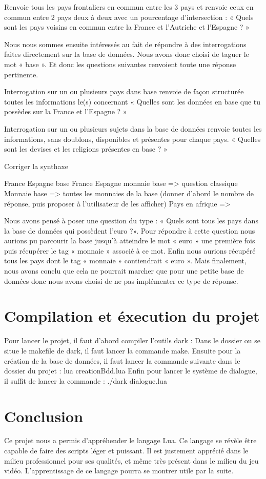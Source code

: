 \documentclass[11pt,a4paper]{article}
\begin{document}
Renvoie tous les pays frontaliers en commun entre les 3 pays et renvoie ceux en commun entre 2 pays deux à deux avec un pourcentage d’intersection :
« Quels sont les pays voisins en commun entre la France et l’Autriche et l’Espagne ? »
 
 
Nous nous sommes ensuite intéressés au fait de répondre à des interrogations faites directement sur la base de données. Nous avons donc choisi de taguer le mot « base ». Et donc les questions suivantes renvoient toute une réponse pertinente.
 
Interrogation sur un ou plusieurs pays dans base renvoie de façon structurée toutes les informations le(s) concernant
« Quelles sont les données en base que tu possèdes sur la France et l’Espagne ? »
 
Interrogation sur un ou plusieurs sujets dans la base de données renvoie toutes les informations, sans doublons, disponibles et présentes pour chaque pays.
« Quelles sont les devises et les religions présentes en base ? »
 
 
 
 
Corriger la synthaxe
 
France Espagne base
France Espagne monnaie base => question classique
Monnaie base => toutes les monnaies de la base  (donner d’abord le nombre de réponse, puis proposer à l’utilisateur de les afficher)
Pays en afrique =>
 
Nous avons pensé à poser une question du type : «  Quels sont tous les pays dans la base de données qui possèdent l’euro ?». Pour répondre à cette question nous aurions pu parcourir la base jusqu’à atteindre le mot « euro » une première fois puis  récupérer le tag « monnaie » associé à ce mot. Enfin nous aurions récupéré tous les pays dont le tag « monnaie » contiendrait « euro ». Mais finalement, nous avons conclu que cela ne pourrait marcher que pour une petite base de données donc nous avons choisi de ne pas implémenter ce type de réponse. 

\section{Compilation et éxecution du projet}
Pour lancer le projet, il faut d'abord compiler l'outils dark :
Dans le dossier ou se situe le makefile de dark, il faut lancer la commande make.
Ensuite pour la création de la base de données, il faut lancer la commande suivante dans le dossier du projet :
lua creationBdd.lua
Enfin pour lancer le système de dialogue, il suffit de lancer la commande :
./dark dialogue.lua

\section{Conclusion}

Ce projet nous a permis d'appréhender le langage Lua. Ce langage se révèle être capable de faire des scripts léger et puissant. Il est justement apprécié dans le milieu professionnel pour ses qualités, et même très présent dans le milieu du jeu vidéo. L'apprentissage de ce langage pourra se montrer utile par la suite.
\end{document}
